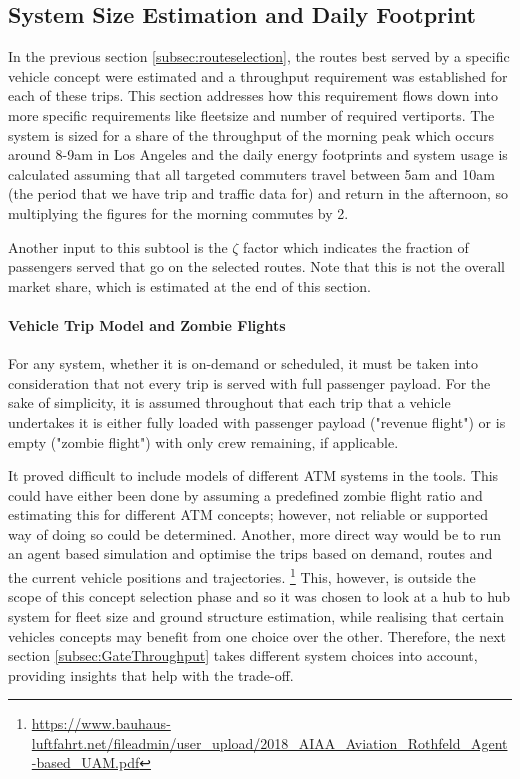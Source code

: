 \subsection{System Size Estimation and Daily Footprint}

In the previous section \ref{subsec:routeselection}, the routes best served by a specific vehicle concept were estimated and a throughput requirement was established for each of these trips. This section addresses how this requirement flows down into more specific requirements like fleetsize and number of required vertiports. The system is sized for a share of the throughput of the morning peak which occurs around 8-9am in Los Angeles and the daily energy footprints and system usage is calculated assuming that all targeted commuters travel between 5am and 10am (the period that we have trip and traffic data for) and return in the afternoon, so multiplying the figures for the morning commutes by 2.

Another input to this subtool is the $\zeta$ factor which indicates the fraction of passengers served that go on the selected routes. Note that this is not the overall market share, which is estimated at the end of this section.


\paragraph{Vehicle Trip Model and Zombie Flights}

For any system, whether it is on-demand or scheduled, it must be taken into consideration that not every trip is served with full passenger payload. For the sake of simplicity, it is assumed throughout that each trip that a vehicle undertakes it is either fully loaded with passenger payload ("revenue flight") or is empty ("zombie flight") with only crew remaining, if applicable.

It proved difficult to include models of different ATM systems in the tools. This could have either been done by assuming a predefined zombie flight ratio and estimating this for different ATM concepts; however, not reliable or supported way of doing so could be determined. Another, more direct way would be to run an agent based simulation and optimise the trips based on demand, routes and the current vehicle positions and trajectories. \footnote{\url{https://www.bauhaus-luftfahrt.net/fileadmin/user_upload/2018_AIAA_Aviation_Rothfeld_Agent-based_UAM.pdf}} This, however, is outside the scope of this concept selection phase and so it was chosen to look at a hub to hub system for fleet size and ground structure estimation, while realising that certain vehicles concepts may benefit from one choice over the other. Therefore, the next section \ref{subsec:GateThroughput} takes different system choices into account, providing insights that help with the trade-off.

